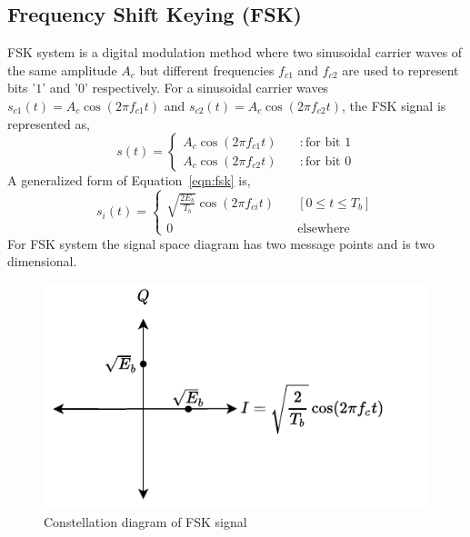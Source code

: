 \documentclass{lab_sheet}
\newcommand\ddfrac[2]{\frac{\displaystyle #1}{\displaystyle #2}}
\begin{document}
\subsection{Frequency Shift Keying (FSK)}
FSK system is a digital modulation method where two sinusoidal carrier waves of the same amplitude $A_c$  but different frequencies $f_{c1}$ and $f_{c2}$ are used to represent bits '$1$' and '$0$' respectively. For a sinusoidal carrier waves $s_{c1}(t)=A_c\cos(2\pi f_{c1} t)$ and $s_{c2}(t)=A_c\cos(2\pi f_{c2} t)$, the FSK signal is represented as,
\begin{equation}
    s(t)=\begin{cases}
        A_c\cos(2\pi f_{c1} t)\quad &: \text{for bit } 1\\
        A_c\cos(2\pi f_{c2} t) \quad &: \text{for bit } 0
    \end{cases}
    \label{eqn:fsk}
\end{equation}
A generalized form of Equation~\ref{eqn:fsk} is, 
\begin{equation}
    s_i(t)=\begin{cases}
        \sqrt{\ddfrac{2E_b}{T_b}}\cos(2\pi f_{ci} t) \quad &[0\leq t \leq T_b]\\
        0 \quad &\text{elsewhere}
    \end{cases}
    \label{eqn:fsk_general}
\end{equation} 
For FSK system the signal space diagram has two message points and is two dimensional.
\begin{figure}[H]
    \centering
    \includegraphics{../Figures/fsk_const}
    \caption{Constellation diagram of FSK signal}
    \label{fig:fsk_const}
\end{figure}
\end{document}
